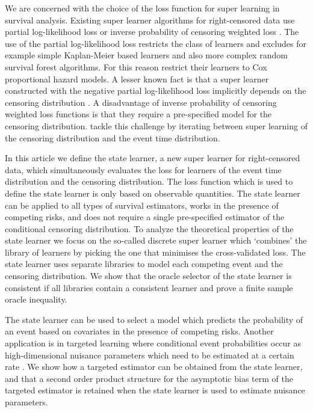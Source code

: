 \documentclass{statsoc}
\newcommand{\1}{\mathds{1}}
\begin{document}
We are concerned with the choice of the loss function for super learning in
survival analysis. Existing super learner algorithms for right-censored data use
partial log-likelihood loss or inverse probability of censoring weighted loss
\citep{polley2011-sl-cens,keles2004asymptotically,golmakani2020super,westling2021inference}.
The use of the partial log-likelihood loss restricts the class of learners and
excludes for example simple Kaplan-Meier based learners and also more complex
random survival forest algorithms. For this reason \cite{golmakani2020super}
restrict their learners to Cox proportional hazard models. A lesser known fact
is that a super learner constructed with the negative partial log-likelihood
loss implicitly depends on the censoring distribution
\citep{hjort1992inference,whitney2019comment}. A disadvantage of inverse
probability of censoring weighted loss functions is that they require a
pre-specified model for the censoring distribution. \cite{westling2021inference}
tackle this challenge by iterating between super learning of the censoring
distribution and the event time distribution.

In this article we define the state learner, a new super learner for
right-censored data, which simultaneously evaluates the loss for learners of the
event time distribution and the censoring distribution. The loss function which
is used to define the state learner is only based on observable
quantities. The state learner can be applied to all types of survival
estimators, works in the presence of competing risks, and does not require a
single pre-specified estimator of the conditional censoring distribution. To
analyze the theoretical properties of the state learner we focus on the
so-called discrete super learner which `combines' the library of
learners by picking the one that minimises the cross-validated loss. The state
learner uses separate libraries to model each competing event and the censoring
distribution. We show that the oracle selector of the state learner is
consistent if all libraries contain a consistent learner and prove a finite
sample oracle inequality.

The state learner can be used to select a model which predicts the probability
of an event based on covariates in the presence of competing risks. Another
application is in targeted learning where conditional event probabilities occur
as high-dimensional nuisance parameters which need to be estimated at a certain
rate \citep{van2011targeted, rytgaard2021estimation, rytgaard2022targeted}. We
show how a targeted estimator can be obtained from the state learner, and that a
second order product structure for the asymptotic bias term of the targeted
estimator is retained when the state learner is used to estimate nuisance
parameters.
\end{document}
